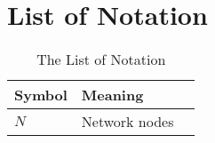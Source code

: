 \documentclass{mcmthesis}	%
\begin{document}
\section{List of Notation}%

\begin{center}%
\begin{longtable}{p{}p{}m{}}
\caption{The List of Notation}\\%
\hline%
Symbol& Meaning \\%
\hline

$N$      & Network nodes
                                                         \\

\end{longtable}
\end{center}
\end{document}
